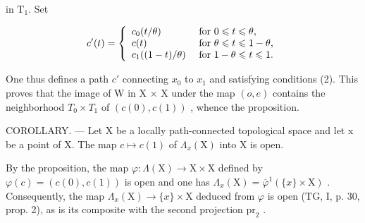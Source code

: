 in \(\mathrm{T}_1\). Set

\[
c ^ {\prime} (t) = \left\{ \begin{array}{l l} c _ {0} (t / \theta) & \text { for } 0 \leqslant t \leqslant \theta , \\ c (t) & \text { for } \theta \leqslant t \leqslant 1 - \theta , \\ c _ {1} ((1 - t) / \theta) & \text { for } 1 - \theta \leqslant t \leqslant 1. \end{array} \right.
\]

One thus defines a path \(c'\) connecting \(x_{0}\) to \(x_{1}\) and satisfying conditions (2). This proves that the image of W in X × X under the map \((o, e)\) contains the neighborhood \(T_{0} \times T_{1}\) of \((c(0), c(1))\) , whence the proposition.

COROLLARY. --- Let X be a locally path-connected topological space and let x be a point of X. The map \(c \mapsto c(1)\) of \(\Lambda_{x}(\mathrm{X})\) into X is open.

By the proposition, the map \(\varphi\colon\Lambda(\mathrm{X})\to\mathrm{X}\times\mathrm{X}\) defined by \(\varphi(c)=(c(0),c(1))\) is open and one has \(\Lambda_{x}(\mathrm{X})=\overline{\varphi}^{1}(\{x\}\times\mathrm{X})\) . Consequently, the map \(\Lambda_{x}(\mathrm{X})\to\{x\}\times\mathrm{X}\) deduced from \(\varphi\) is open (TG, I, p. 30, prop. 2), as is its composite with the second projection \(\mathrm{pr}_{2}\) .

